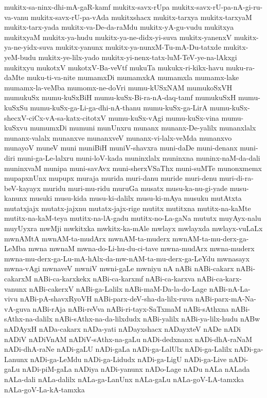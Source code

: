 {mukitx-sa-ninx-dhi-mA-gaR-kamf
mukitx-savx-rUpa
mukitx-savx-rU-pa-nA-gi-ru-va-vanu
mukitx-savx-rU-pa-vAda
mukitxshacx
mukitx-tarxya
mukitx-tarxyaM
mukitx-tarx-yada
mukitx-va-De-da-raMdu
mukitx-yA-gu-vudu
mukitxya
mukitxyaM
mukitx-ya-hudu
mukitx-ya-ne-didx-yi-suva
mukitx-yanenxV
mukitx-ya-ne-yidx-suva
mukitx-yanunx
mukitx-ya-nunxM-Tu-mA-Du-tatxde
mukitx-yeM-budu
mukitx-ye-lilx-yado
mukitx-yi-nenx-tatx-luM-TeV-ye-na-lAkxgi
mukitxyu
mukotxV
mukotxV-Ba-veVtf
mukuTa
mukukx-ri-kikx-havu
muku-ra-daMte
muku-ti-va-nite
mumamxDi
mumamxkA
mumamxla
mumamx-lake
mumamx-la-veMba
mumomx-ne-doVri
mumu-kUSxNAM
mumukoSxVH
mumukuSx
mumu-kuSxBiH
mumu-kuSx-Bi-ra-nA-daq-tamf
mumukuSxH
mumu-kuSxSu
mumu-kuSx-ga-Li-ga-dhi-nA-thanu
mumu-kuSx-ga-LirA
mumu-kuSx-shecxV-ciCx-vA-sa-katx-citotxV
mumu-kuSx-vAgi
mumu-kuSx-vina
mumu-kuSxvu
mumumxDi
mumuni
munUnxru
munanx
munanx-De-yalilx
munanxlalx
munanx-valalx
munanxve
munanxveV
munanx-vi-lalx-veMda
munanxvo
munayoV
muneV
muni
muniBiH
muniV-shavxra
muni-daDe
muni-denanx
muni-diri
muni-ga-Le-lalxru
muni-loV-kada
muninxlalx
muninxna
muninx-naM-da-dali
muninxvaM
munipa
muni-savAvx
muni-sherxVSaThx
muni-suMTe
munonxmemx
mupapxnUnx
mupupx
muraja
murida
muri-danu
muride
muri-denu
muri-di-ra-beV-kayayx
muridu
muri-mu-ridu
muruGa
musatx
musu-ka-nu-gi-yade
musu-kanunx
musuki
musu-kida
musu-ki-dalilx
musu-ki-mAya
musuku
mutAtxta
mutatxjajx
mutatx-jajxnu
mutatx-jajx-rige
mutitx
mutitxna
mutitx-na-kaMte
mutitx-na-kaM-teya
mutitx-na-lA-gadu
mutitx-no-La-gaNa
mututx
muyAyx-nalu
muyUyxra
mwMji
mwkitxka
mwkitx-ka-mAle
mwlayx
mwlayxda
mwlayx-vuLaLx
mwnAMtA
mwnAM-ta-mudArx
mwnAM-ta-muderx
mwnAM-ta-mu-derx-ga-LeMba
mwna
mwnaM
mwna-do-Li-hu-du-ci-tave
mwna-mudArx
mwna-muderx
mwna-mu-derx-ga-Lu-mA-hAlx-da-mw-nAM-ta-mu-derx-ga-LeYdu
mwnasayx
mwna-vAgi
mwnaveV
mwniV
mwni-gaLe
mwniyu
nA
nABi
nABi-cakarx
nABi-cakarxM
nABi-ca-karxkekx
nABi-ca-karxmf
nABi-ca-karxva
nABi-ca-karx-vanunx
nABi-cakerxV
nABi-ga-Lalilx
nABi-maM-Da-la-do-Lage
nABi-nA-La-vivu
nABi-pA-shavxRyoVH
nABi-parx-deV-sha-da-lilx-ruva
nABi-parx-mA-Na-vA-guva
nABi-rAja
nABi-reVva
nABi-ri-tayx-SaTxmaM
nABi-sAthxna
nABi-sAthx-na-dalilx
nABi-sAthx-na-da-lilxdudx
nABi-yalilx
nABi-ya-lilx-hudu
nABw
nADAyxH
nADa-cakarx
nADa-yati
nADayxshacx
nADayxteV
nADe
nADi
nADiV
nADiVnAM
nADiV-sAthx-na-gaLu
nADi-dedxnanx
nADi-dhA-raNaM
nADi-dhA-raNe
nADi-gaLU
nADi-gaLa
nADi-ga-LalUlx
nADi-ga-Lalilx
nADi-ga-Lanunx
nADi-ga-LeMdu
nADi-ga-Lidudx
nADi-ga-LigU
nADi-ga-Live
nADi-gaLu
nADi-piM-gaLa
nADiya
nADi-yanunx
nADo-Lage
nADu
nALa
nALada
nALa-dali
nALa-dalilx
nALa-ga-LanUnx
nALa-gaLu
nALa-goV-LA-tamxka
nALa-goV-La-kA-tamxka
}
